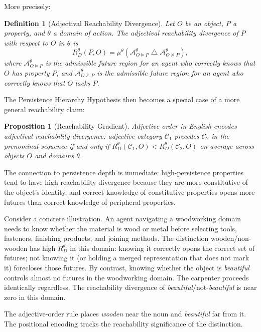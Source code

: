 \documentclass[11pt]{article}
\theoremstyle{rthm}
\newtheorem{proposition}[theorem]{Proposition}
\theoremstyle{rdef}
\newtheorem{definition}[theorem]{Definition}
\theoremstyle{remark}
\newcommand{\A}{\mathcal{A}}
\newcommand{\RD}[1][\theta]{R_{D}^{#1}}
\begin{document}
More precisely:

\begin{definition}[Adjectival Reachability Divergence]
\label{def:ard}
Let $O$ be an object, $P$ a property, and $\theta$ a domain of action.
The \emph{adjectival reachability divergence} of $P$ with respect to $O$
in $\theta$ is
\[
\RD[\theta](P, O)
= \mu^\theta\!\left(\A^\theta_{O \models P} \;\triangle\; \A^\theta_{O \not\models P}\right),
\]
where $\A^\theta_{O \models P}$ is the admissible future region for an agent
who correctly knows that $O$ has property $P$, and $\A^\theta_{O \not\models P}$
is the admissible future region for an agent who correctly knows that $O$
lacks $P$.
\end{definition}

The Persistence Hierarchy Hypothesis then becomes a special case of a more
general reachability claim:

\begin{proposition}[Reachability Gradient]
\label{prop:gradient}
Adjective order in English encodes adjectival reachability divergence:
adjective category $\mathcal{C}_1$ precedes $\mathcal{C}_2$ in the prenominal
sequence if and only if $\RD[\theta](\mathcal{C}_1, O) < \RD[\theta](\mathcal{C}_2, O)$
on average across objects $O$ and domains $\theta$.
\end{proposition}

The connection to persistence depth is immediate: high-persistence properties
tend to have high reachability divergence because they are more constitutive
of the object's identity, and correct knowledge of constitutive properties
opens more futures than correct knowledge of peripheral properties.

Consider a concrete illustration. An agent navigating a woodworking domain
needs to know whether the material is wood or metal before selecting
tools, fasteners, finishing products, and joining methods. The distinction
wooden/non-wooden has high $\RD$ in this domain: knowing it correctly
opens the correct set of futures; not knowing it (or holding a merged
representation that does not mark it) forecloses those futures. By contrast,
knowing whether the object is \emph{beautiful} controls almost no futures
in the woodworking domain. The carpenter proceeds identically regardless.
The reachability divergence of \emph{beautiful}/not-\emph{beautiful} is
near zero in this domain.

The adjective-order rule places \emph{wooden} near the noun and
\emph{beautiful} far from it. The positional encoding tracks the
reachability significance of the distinction.
\end{document}
